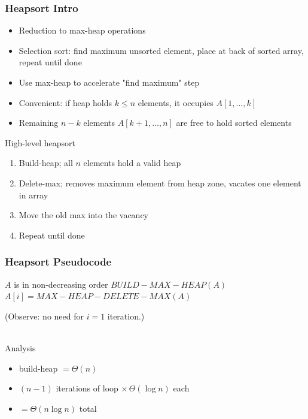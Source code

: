 \documentclass{beamer}
\newcommand{\stanza}{ \\~\ }
\begin{document}
\begin{frame} \frametitle{Heapsort Intro}
\begin{itemize}
  \item Reduction to max-heap operations
  \item Selection sort: find maximum unsorted element, place at back of sorted array, repeat until done
  \item Use max-heap to accelerate "find maximum" step
  \item Convenient: if heap holds $k \leq n$ elements, it occupies
    $A[1, \ldots, k]$
  \item Remaining $n-k$ elements $A[k+1, \ldots, n]$ are free to hold sorted elements
\end{itemize}

High-level heapsort
\begin{enumerate}
  \item Build-heap; all $n$ elements hold a valid heap
  \item Delete-max; removes maximum element from heap zone, vacates one element in array
  \item Move the old max into the vacancy
  \item Repeat until done
\end{enumerate}
\end{frame}

\begin{frame} \frametitle{Heapsort Pseudocode}
  \begin{algorithmic}[1]
    \Ensure $A$ is in non-decreasing order
    \State $BUILD-MAX-HEAP(A)$
      \State $A[i] = MAX-HEAP-DELETE-MAX(A)$
    \EndFor
    \EndFunction
  \end{algorithmic}
(Observe: no need for $i=1$ iteration.) \stanza

Analysis
\begin{itemize}
  \item build-heap $= \Theta(n)$
  \item $(n-1)$ iterations of loop $\times \, \Theta(\log n)$ each
  \item $= \Theta(n \log n)$ total
\end{itemize}
\end{frame}
\end{document}
